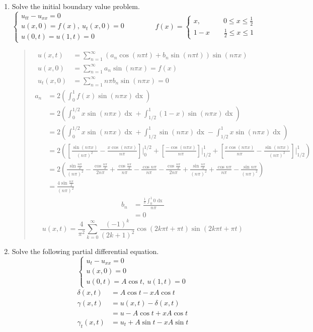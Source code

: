 \documentclass{article}
\newcommand{\beq}{\begin{quote}}
\newcommand{\eeq}{\end{quote}}
\newcommand{\dx}{\mathop{dx}}
\begin{document}
\begin{enumerate}
\item Solve the initial boundary value problem.
\[
\begin{cases*}
u_{tt} - u_{xx} = 0\\
u(x,0) = f(x),\ u_{t}(x,0) = 0\\
u(0,t) = u(1,t) = 0
\end{cases*}
\qquad\qquad
f(x) =
\begin{cases*}
x,\qquad\quad\ 0\leq x\leq\frac{1}{2}\\
1- x\qquad \frac{1}{2}\leq x\leq 1
\end{cases*}
\]
\beq
\begin{align*}
u(x,t) &= \sum_{n=1}^{\infty}(a_{n}\cos{(n\pi t)} + b_{n}\sin{(n\pi t)})\sin{(n\pi x)}\\
u(x,0) &= \sum_{n=1}^{\infty}a_{n}\sin{(n\pi x)} = f(x)\\
u_{t}(x,0) &= \sum_{n=1}^{\infty}n\pi b_{n}\sin{(n\pi x)} = 0
\end{align*}
\begin{align*}
a_{n} &= 2\left(\int_{0}^{1}f(x)\sin{(n\pi x)}\dx\right)\\
&= 2\left(\int_{0}^{1/2}x\sin{(n\pi x)}\dx + \int_{1/2}^{1}(1-x)\sin{(n\pi x)}\dx\right)\\
&= 2\left(\int_{0}^{1/2}x\sin{(n\pi x)}\dx + \int_{1/2}^{1}\sin{(n\pi x)}\dx - \int_{1/2}^{1}x\sin{(n\pi x)}\dx\right)\\
&= 2\left(\left[\frac{\sin{(n\pi x)}}{(n\pi)^{2}} - \frac{x\cos{(n\pi x)}}{n\pi}\right]\Bigg|_{0}^{1/2} + \left[ \frac{-\cos{(n\pi x)}}{n\pi}\right]\Bigg|_{1/2}^{1} + \left[\frac{x\cos{(n\pi x)}}{n\pi} - \frac{\sin{(n\pi x)}}{(n\pi)^2}\right]\Bigg|_{1/2}^{1}\right)\\
&= 2\left(\frac{\sin{\frac{n\pi}{2}}}{(n\pi)^2} - \frac{\cos{\frac{n\pi}{2}}}{2n\pi} + \frac{\cos{\frac{n\pi}{2}}}{n\pi} - \frac{\cos{n\pi}}{n\pi} - \frac{\cos{\frac{n\pi}{2}}}{2n\pi} + \frac{\sin{\frac{n\pi}{2}}}{(n\pi)^{2}} + \frac{\cos{n\pi}}{n\pi} - \frac{\sin{n\pi}}{(n\pi)^{2}}\right)\\
&= \frac{4\sin{\frac{n\pi}{2}}}{(n\pi)^{2}}
\end{align*}
\begin{align*}
b_{n} &= \frac{\frac{1}{\pi}\int_{0}^{1}0\dx}{n\pi}\\
&= 0
\end{align*}
\[
u(x,t) = \frac{4}{\pi^{2}}\sum_{k=0}^{\infty}\frac{(-1)^{k}}{(2k+1)^{2}}\cos{(2k\pi t + \pi t)}\sin{(2k\pi t + \pi t)}
\]
\eeq


\newpage
\item Solve the following partial differential equation.
\[
\begin{cases*}
u_{t} - u_{xx} = 0\\
u(x,0) = 0\\
u(0,t) = A\cos{t},\ u(1,t) = 0
\end{cases*}
\]
\begin{align*}
\delta(x,t) &= A\cos{t} - xA\cos{t}\\
\gamma(x,t) &= u(x,t) - \delta(x,t)\\
&= u - A\cos{t} + xA\cos{t}\\
\gamma_{t}(x,t) &= u_{t} + A\sin{t} - xA\sin{t}
\end{align*}
\end{enumerate}
\end{document}
